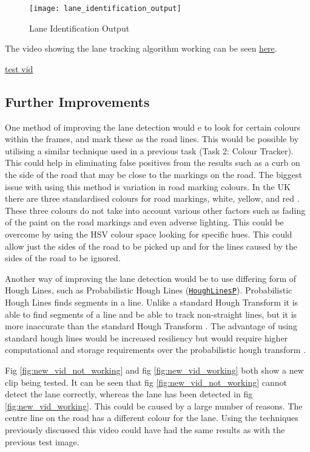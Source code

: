 \documentclass[conference]{IEEEtran}
\begin{document}
\begin{figure}[H]
\centerline{\texttt{[image: lane\_identification\_output]}}
\caption{Lane Identification Output}
\label{fig:lane_identification_output}
\end{figure}

The video showing the lane tracking algorithm working can be seen \href{}{here}.

\href{https://www.youtube.com/watch?v=OOPWzhFnCZg&t=2s}{test vid}


\subsection{Further Improvements}

One method of improving the lane detection would e to look for certain colours within the frames, and mark these as the road lines. This would be possible by utilising a similar technique used in a previous task (Task 2: Colour Tracker). This could help in eliminating false positives from the results such as a curb on the side of the road that may be close to the markings on the road. The biggest issue with using this method is variation in road marking colours. In the UK there are three standardised colours for road markings, white, yellow, and red \cite{road_markings}. These three colours do not take into account various other factors such as fading of the paint on the road markings and even adverse lighting. This could be overcome by using the HSV colour space looking for specific hues. This could allow just the sides of the road to be picked up and  for the lines caused by the sides of the road to be ignored. 

Another way of improving the lane detection would be to use differing form of Hough Lines, such as Probabilistic Hough Lines (\href{https://docs.opencv.org/4.x/dd/d1a/group__imgproc__feature.html#ga8618180a5948286384e3b7ca02f6feeb}{\texttt{HoughLinesP}}). Probabilistic Hough Lines finds segments in a line. Unlike a standard Hough Transform it is able to find segments of a line and be able to track non-straight lines, but it is more inaccurate than the standard Hough Transform \cite{hough_book}. The advantage of using standard hough lines would be increased resiliency but would require higher computational and storage requirements over the probabilistic hough transform \cite{improvement_to_hough_lines}. 

Fig \ref{fig:new_vid_not_working} and fig \ref{fig:new_vid_working} both show a new clip being tested. It can be seen that fig \ref{fig:new_vid_not_working} cannot detect the lane correctly, whereas the lane has been detected in fig \ref{fig:new_vid_working}. This could be caused by a large number of reasons. The centre line on the road has a different colour for the lane. Using the techniques previously discussed this video could have had the same results as with the previous test image. 
\end{document}
